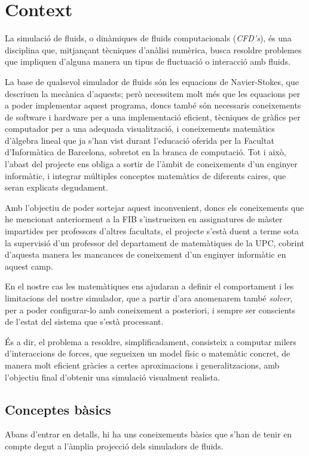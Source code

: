 \documentclass[a4paper]{article} %
\begin{document}
	\section{Context}
	La simulació de fluids, o dinàmiques de fluids computacionals (\textit{CFD's}), és una disciplina que, mitjançant tècniques d'anàlisi numèrica, busca resoldre problemes que impliquen d'alguna manera un tipus de fluctuació o interacció amb fluids. \par
	La base de qualsevol simulador de fluids són les equacions de Navier-Stokes, que descriuen la mecànica d'aquests; però necessitem molt més que les equacions per a poder implementar aquest programa, doncs també són necessaris coneixements de software i hardware per a una implementació eficient, tècniques de gràfics per computador per a una adequada visualització, i coneixements matemàtics d'àlgebra lineal que ja s'han vist durant l'educació oferida per la Facultat d'Informàtica de Barcelona, sobretot en la branca de computació. Tot i això, l'abast del projecte ens obliga a sortir de l'àmbit de coneixements d'un enginyer informàtic, i integrar múltiples conceptes matemàtics de diferents caires, que seran explicats degudament. \par
	Amb l'objectiu de poder sortejar aquest inconvenient, doncs els coneixements que he mencionat anteriorment a la FIB s'instrueixen en assignatures de màster impartides per professors d'altres facultats, el projecte s'està duent a terme sota la supervisió d'un professor del departament de matemàtiques de la UPC, cobrint d'aquesta manera les mancances de coneixement d'un enginyer informàtic en aquest camp.\par
	En el nostre cas les matemàtiques ens ajudaran a definir el comportament i les limitacions del nostre simulador, que a partir d'ara anomenarem també \textit{solver}, per a poder configurar-lo amb coneixement a posteriori, i sempre ser conscients de l'estat del sistema que s'està processant. \par
	És a dir, el problema a resoldre, simplificadament, consisteix a computar milers d'interaccions de forces, que segueixen un model físic o matemàtic concret, de manera molt eficient gràcies a certes aproximacions i generalitzacions, amb l'objectiu final d'obtenir una simulació visualment realista.
	
	\subsection{Conceptes bàsics}
	Abans d'entrar en detalls, hi ha uns coneixements bàsics que s'han de tenir en compte degut a l'àmplia projecció dels simuladors de fluids.
\end{document}
